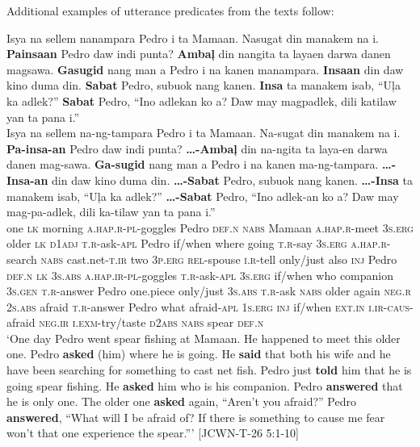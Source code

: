 Additional examples of utterance predicates from the texts follow:

\ea
Isya  na  sellem  nanampara  Pedro  i  ta  Mamaan. Nasugat  din  manakem  na i.  \textbf{Painsaan}  Pedro  daw  indi  punta?  \textbf{Ambaļ}  din  nangita  ta  layaen  darwa  danen magsawa.  \textbf{Gasugid}  nang  man  a  Pedro  i  na  kanen manampara.   \textbf{Insaan}  din  daw  kino  duma  din. \textbf{Sabat}  Pedro,  subuok  nang  kanen. \textbf{Insa}  ta  manakem  isab, “Uļa  ka  adlek?”  \textbf{Sabat}  Pedro,  “Ino  adlekan  ko  a?  Daw  may magpadlek,  dili  katilaw  yan  ta  pana  i.”\\\smallskip
\gll Isya  na  sellem  na-ng-tampara  Pedro  i  ta  Mamaan. Na-sugat  din  manakem  na i.  \textbf{Pa-insa-an}  Pedro  daw  indi  punta?  \textbf{ …-Ambaļ}  din  na-ngita  ta  laya-en  darwa  danen mag-sawa.  \textbf{Ga-sugid}  nang  man  a  Pedro  i  na  kanen ma-ng-tampara.  \textbf{ …-Insa-an}  din  daw  kino  duma  din. \textbf{ …-Sabat}  Pedro,  subuok  nang  kanen. \textbf{ …-Insa}  ta  manakem  isab, “Uļa  ka  adlek?”  \textbf{ …-Sabat}  Pedro,  “Ino  adlek-an  ko  a?  Daw  may mag-pa-adlek,  dili  ka-tilaw  yan  ta  pana  i.”\\
one  \textsc{lk}  morning  \textsc{a.hap.r}-\textsc{pl}-goggles  Pedro  \textsc{def.n}  \textsc{nabs}  Mamaan \textsc{a.hap.r}-meet  3\textsc{s.erg}  older  \textsc{lk} \textsc{d1adj}  \textsc{t.r}-ask-\textsc{apl}  Pedro if/when  where going  \textsc{t.r}-say  3\textsc{s.erg}  \textsc{a.hap.r}-search  \textsc{nabs}   cast.net-\textsc{t.ir}  two  3\textsc{p.erg} \textsc{rel}-spouse  \textsc{i.r}-tell  only/just  also  \textsc{inj}  Pedro  \textsc{def.n}  \textsc{lk}  3\textsc{s.abs} \textsc{a.hap.ir}-\textsc{pl}-goggles \textsc{t.r}-ask-\textsc{apl}  3\textsc{s.erg}  if/when  who  companion  3\textsc{s.gen}
\textsc{t.r}-answer  Pedro  one.piece  only/just  3\textsc{s.abs}  \textsc{t.r}-ask   \textsc{nabs}  older  again
\textsc{neg.r}  2\textsc{s.abs}  afraid  \textsc{t.r}-answer  Pedro  what  afraid-\textsc{apl}  1\textsc{s.erg}  \textsc{inj}  if/when  \textsc{ext.in} \textsc{i.ir}-\textsc{caus}-afraid  \textsc{neg.ir}  \textsc{i.exm}-try/taste  \textsc{d2abs}  \textsc{nabs}  spear  \textsc{def.n} \\
\glt `One day Pedro went spear fishing at Mamaan. He happened to meet this older one. Pedro \textbf{asked} (him) where he is going. He \textbf{said} that both his wife and he have been searching for something to cast net fish. Pedro just \textbf{told} him that he is going spear fishing. He \textbf{asked} him who is his companion. Pedro \textbf{answered} that he is only one. The older one \textbf{asked} again, “Aren’t you afraid?” Pedro \textbf{answered}, “What will I be afraid of? If there is something to cause me fear won’t that one experience the spear.”' [JCWN-T-26 5:1-10]
